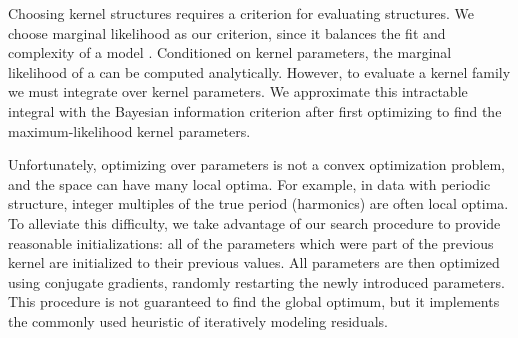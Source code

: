 Choosing kernel structures requires a criterion for evaluating structures.
We choose marginal likelihood as our criterion, since it balances the fit and complexity of a model \citep{rasmussen2001occam}.
Conditioned on kernel parameters, the marginal likelihood of a \gp{} can be computed analytically.
However, to evaluate a kernel family we must integrate over kernel parameters.
We approximate this intractable integral with the Bayesian information criterion \citep{schwarz1978estimating} after first optimizing to find the maximum-likelihood kernel parameters.

Unfortunately, optimizing over parameters is not a convex optimization problem, and the space can have many local optima.
For example, in data with periodic structure, integer multiples of the true period (harmonics) are often local optima. 
%
To alleviate this difficulty, we take advantage of our search procedure to provide reasonable initializations: all of the parameters which were part of the previous kernel are initialized to their previous values.
All parameters are then optimized using conjugate gradients, randomly restarting the newly introduced parameters.
This procedure is not guaranteed to find the global optimum, but it implements the commonly used heuristic of iteratively modeling residuals.

